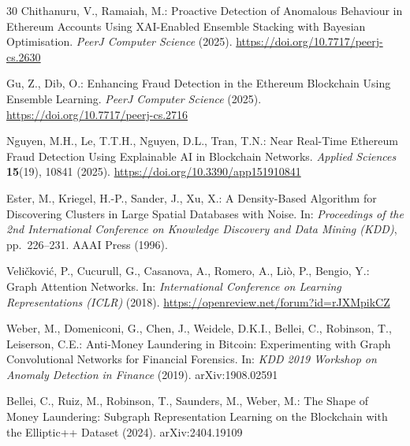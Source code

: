 \documentclass[12pt,a4paper]{article}
\begin{document}
\begin{thebibliography}{30}
  Chithanuru, V., Ramaiah, M.:
  Proactive Detection of Anomalous Behaviour in Ethereum
  Accounts Using XAI-Enabled Ensemble Stacking with
  Bayesian Optimisation.
  \textit{PeerJ Computer Science} (2025).
  \url{https://doi.org/10.7717/peerj-cs.2630}

  Gu, Z., Dib, O.:
  Enhancing Fraud Detection in the Ethereum Blockchain
  Using Ensemble Learning.
  \textit{PeerJ Computer Science} (2025).
  \url{https://doi.org/10.7717/peerj-cs.2716}

  Nguyen, M.H., Le, T.T.H., Nguyen, D.L., Tran, T.N.:
  Near Real-Time Ethereum Fraud Detection Using
  Explainable AI in Blockchain Networks.
  \textit{Applied Sciences} \textbf{15}(19), 10841 (2025).
  \url{https://doi.org/10.3390/app151910841}

  Ester, M., Kriegel, H.-P., Sander, J., Xu, X.:
  A Density-Based Algorithm for Discovering Clusters in
  Large Spatial Databases with Noise.
  In: \textit{Proceedings of the 2nd International
  Conference on Knowledge Discovery and Data Mining
  (KDD)}, pp.\ 226--231. AAAI Press (1996).

  Veli\v{c}kovi\'{c}, P., Cucurull, G., Casanova, A.,
  Romero, A., Li\`{o}, P., Bengio, Y.:
  Graph Attention Networks.
  In: \textit{International Conference on Learning
  Representations (ICLR)} (2018).
  \url{https://openreview.net/forum?id=rJXMpikCZ}

  Weber, M., Domeniconi, G., Chen, J., Weidele, D.K.I.,
  Bellei, C., Robinson, T., Leiserson, C.E.:
  Anti-Money Laundering in Bitcoin: Experimenting with
  Graph Convolutional Networks for Financial Forensics.
  In: \textit{KDD 2019 Workshop on Anomaly Detection in
  Finance} (2019).
  arXiv:1908.02591

  Bellei, C., Ruiz, M., Robinson, T., Saunders, M.,
  Weber, M.:
  The Shape of Money Laundering: Subgraph Representation
  Learning on the Blockchain with the Elliptic++
  Dataset (2024).
  arXiv:2404.19109

\end{thebibliography}
\end{document}
